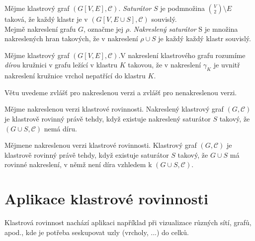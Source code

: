 \begin{defn}
Mějme klastrový graf $(G[V,E],\mathcal C)$. \textit{Saturátor} $S$ je podmnožina ${V \choose 2} \setminus E$ taková, že každý klastr je v $(G[V,E \cup S],\mathcal C)$ souvislý. \\
Mejmě nakreslení grafu $G$, označme jej $\rho$. \textit{Nakreslený saturátor} S je množina nakreslených hran takových, že v nakreslení $\rho \cup S$ je každý každý klastr souvislý. 
\end{defn}

\begin{defn}
Mějme klastrový graf $(G[V,E],\mathcal C)$.V nakreslení klastrového grafu rozumíme \textit{dírou} kružnici v grafu ležící v klastru $K$ takovou, že v nakreslení $\gamma_K$  je uvnitř nakreslení kružnice vrchol nepatřící do klastru $K$.
\end{defn}

Větu uvedeme zvlášť pro nakreslenou verzi  a zvlášť pro nenakreslenou verzi.

\begin{theorem}Mějme nakreslenou verzi klastrové rovinnosti. Nakreslený klastrový graf $(G,\mathcal C)$ je klastrově rovinný právě tehdy, když existuje nakreslený saturátor $S$ takový, že $(G \cup S,\mathcal C)$ nemá díru.
\end{theorem}

\begin{theorem}Mějmene nakreslenou verzi klastrové rovinnosti. Klastrový graf $(G,\mathcal C)$ je klastrově rovinný právě tehdy, když existuje saturátor $S$ takový, že $G \cup S$ má rovinné nakreslení, v němž není díra vzhledem k $(G \cup S,\mathcal C)$.
\end{theorem}

\section{Aplikace klastrové rovinnosti}
Klastrová rovinnost nachází aplikaci například při vizualizace různých sítí, grafů, apod., kde je potřeba seskupovat uzly (vrcholy, ...) do celků.
